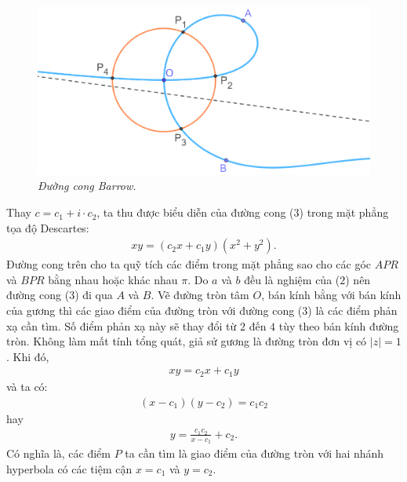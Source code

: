 \begin{multicols}{2}
	\begin{figure}[H]
		\vspace*{-5pt}
		\centering
		\captionsetup{labelformat= empty, justification=centering}
		\includegraphics[width= 1\linewidth]{14}
		\caption{\small\textit{\color{lichsutoanhoc}Đường cong Barrow.}}
		\vspace*{-10pt}
	\end{figure}
	Thay $c=c_1+i\cdot c_2$, ta thu được biểu diễn của đường cong ($3$) trong mặt phẳng tọa độ Descartes:
	\begin{align*}
		xy = \left(c_2x + c_1y\right)\left(x^2 + y^2\right).
	\end{align*}
	Đường cong trên cho ta quỹ tích các điểm trong mặt phẳng sao cho các góc $APR$ và $BPR$ bằng nhau hoặc khác nhau $\pi$. Do $a$ và $b$ đều là nghiệm của ($2$) nên đường cong ($3$) đi qua $A$ và $B$. Vẽ đường tròn tâm $O$, bán kính bằng với bán kính của gương thì các giao điểm của đường tròn với đường cong ($3$) là các điểm phản xạ cần tìm. Số điểm phản xạ này sẽ thay đổi từ $2$ đến $4$ tùy theo bán kính đường tròn.
	\vskip 0.1cm
	Không làm mất tính tổng quát, giả sử gương là đường tròn đơn vị có $|z| = 1$. Khi đó,
	\begin{align*}
		xy = c_2x + c_1y
	\end{align*}
	và ta có:
	\begin{align*}
		\left(x-c_1\right)(y-c_2)= c_1c_2
	\end{align*}
	hay
	\begin{align*}
		y = \frac{c_1c_2}{x - c_1} + c_2.
	\end{align*}
	Có nghĩa là, các điểm $P$ ta cần tìm là giao điểm của đường tròn với hai nhánh hyperbola có các tiệm cận $x=c_1$ và $y=c_2$.
	\begin{figure}[H]
		\vspace*{-5pt}
		\centering
		\captionsetup{labelformat= empty, justification=centering}

\end{figure}
\end{multicols}
